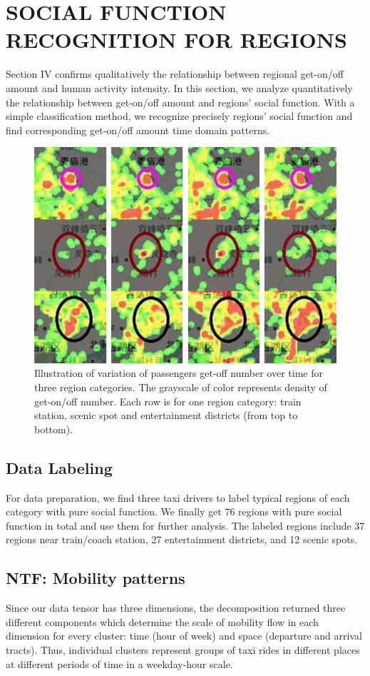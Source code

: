 \documentclass[a4paper, 10pt, conference]{ieeeconf}      %
\begin{document}
\section{SOCIAL FUNCTION RECOGNITION FOR REGIONS}%
Section IV confirms qualitatively the relationship between regional get-on/off amount and human activity intensity. In this section, we analyze quantitatively the relationship between get-on/off amount and regions’ social function. With a simple classification method, we recognize precisely regions’ social function and find corresponding get-on/off amount time domain patterns.
\begin{figure}[ht]
    \centering
    \includegraphics{fig/f2.png}
    \caption{Illustration of variation of passengers get-off number over time for three region categories. The grayscale of color represents density of get-on/off number. Each row is for one region category: train station, scenic spot and entertainment districts (from top to bottom).}
    \label{fig:my_label_2}
\end{figure}
\subsection{Data Labeling} For data preparation, we find three taxi drivers to label typical regions of each category with pure social function. We finally get 76 regions with pure social function in total and use them for further analysis. The labeled regions include 37 regions near train/coach station, 27 entertainment districts, and 12 scenic spots.

\subsection{NTF: Mobility patterns}Since our data tensor has three dimensions, the decomposition returned three different components which determine the scale of mobility flow in each dimension for every cluster: time (hour of week) and space (departure and arrival tracts). Thus, individual clusters represent groups of taxi rides in different places at different periods of time in a weekday-hour scale.
\end{document}
